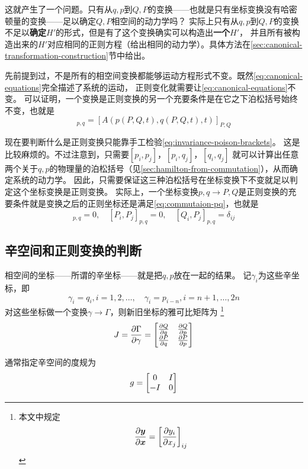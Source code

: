 \documentclass[UTF8, a4paper]{ctexart}
\begin{document}
这就产生了一个问题。只有从$q, p$到$Q, P$的变换——也就是只有坐标变换没有哈密顿量的变换——足以确定$Q, P$相空间的动力学吗？
实际上只有从$q, p$到$Q, P$的变换不足以\textbf{确定}$H'$的形式，但是有了这个变换确实可以构造出\textbf{一个}$H'$，
并且所有被构造出来的$H'$对应相同的正则方程（给出相同的动力学）。具体方法在\ref{sec:canonical-transformation-construction}节中给出。

先前提到过，不是所有的相空间变换都能够运动方程形式不变。既然\eqref{eq:canonical-equations}完全描述了系统的运动，
正则变化就需要让\eqref{eq:canonical-equations}不变。
可以证明，一个变换是正则变换的另一个充要条件是在它之下泊松括号始终不变，也就是
\begin{equation}
    [A(p,q,t), B(p,q,t)]_{p, q} = [A(p(P,Q,t), q(P,Q,t), t)]_{P, Q}
    \label{eq:invariance-poison-brackets}
\end{equation}

现在要判断什么是正则变换只能靠手工检验\eqref{eq:invariance-poison-brackets}。
这是比较麻烦的。不过注意到，只需要$[p_i, p_j]$，$[p_i, q_j]$，$[q_i, q_j]$
就可以计算出任意两个关于$q, p$的物理量的泊松括号（见\ref{sec:hamilton-from-commutation}），从而确定系统的动力学。
因此，只需要保证这三种泊松括号在坐标变换下不变就足以判定这个坐标变换是正则变换。
实际上，一个坐标变换$p, q \longrightarrow P, Q$是正则变换的充要条件就是变换之后的正则坐标还是满足\eqref{eq:commutaion-pq}，也就是
\begin{equation}
    [Q_i, Q_j]_{p, q} = 0, \quad [P_i, P_j]_{p, q} = 0, \quad [Q_i, P_j]_{p, q} = \delta_{ij}
\end{equation}

\subsection{辛空间和正则变换的判断}\label{sec:sympletic-space}

相空间的坐标——所谓的辛坐标——就是把$q,p$放在一起的结果。
记$\gamma_i$为这些辛坐标，即
\[
    \gamma_i = q_i, i=1, 2, \ldots, \quad \gamma_i=p_{i-n}, i=n+1, \ldots, 2n
\]
对这些坐标做一个变换$\gamma \longrightarrow \Gamma$，则新旧坐标的雅可比矩阵为%
\footnote{本文中规定
\[
    \pdv{\vb*{y}}{\vb*{x}} = \left[ \pdv{y_i}{x_j} \right]_{ij}
\]
}
\begin{equation}
    J = \pdv{\Gamma}{\gamma} = \mqty[ \pdv{Q}{q} & \pdv{Q}{p} \\ \pdv{P}{q} & \pdv{P}{p} ]
    \label{eq:jacobian}
\end{equation}

通常指定辛空间的度规为
\begin{equation}
    g = \mqty[ 0 & I \\ -I & 0 ]
\end{equation}
\end{document}
